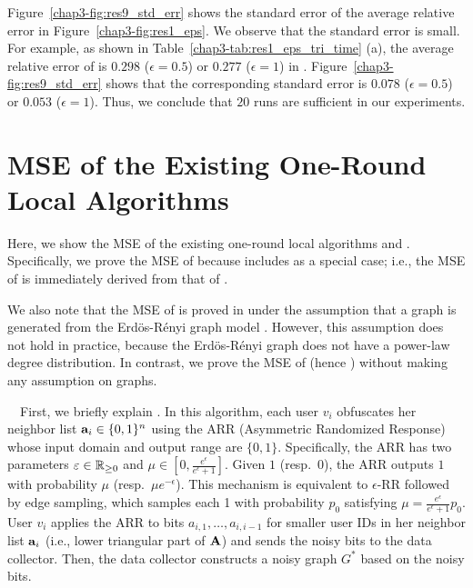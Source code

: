 Figure~\ref{chap3-fig:res9_std_err} shows the standard error of the average relative error in Figure~\ref{chap3-fig:res1_eps}. 
We observe that the standard error is small. 
For example, as shown in Table~\ref{chap3-tab:res1_eps_tri_time} (a), the average relative error of \AlgWSTriVR{} is $0.298$ ($\epsilon=0.5$) or $0.277$ ($\epsilon=1$) in \Gplus{}. 
Figure~\ref{chap3-fig:res9_std_err} shows that the corresponding standard error is $0.078$ ($\epsilon=0.5$) or $0.053$ ($\epsilon=1$). Thus, we conclude that $20$ runs are sufficient in our experiments. 

\section{MSE of the Existing One-Round Local Algorithms}
\label{chap3-sec:upper}

Here, we show the MSE of the existing one-round local algorithms \AlgARRTri{} \cite{Imola_USENIX22} and \AlgRRTri{} \cite{Imola_USENIX21}.
Specifically, we prove the MSE of \AlgARRTri{} because \AlgARRTri{} includes \AlgRRTri{} as a special case; i.e., the MSE of \AlgRRTri{} is immediately derived from that of \AlgARRTri{}.

We also note that the MSE of \AlgRRTri{} is proved in \cite{Imola_USENIX21} under the assumption that a graph is generated from the Erd\"os-R\'enyi graph model \cite{NetworkScience}.
However, this assumption does not hold in practice, because the Erd\"os-R\'enyi graph does not have a power-law degree distribution.
In contrast, we prove the MSE of \AlgARRTri{} (hence \AlgRRTri{}) without making any assumption on graphs.


\smallskip
{}~~First, we briefly explain \AlgARRTri{}.
In this algorithm, each user $v_i$ obfuscates her neighbor list $\mathbf{a}_i \in \{0,1\}^n$ using the ARR (Asymmetric Randomized Response) whose input domain and output range are $\{0,1\}$.
Specifically, the ARR has two parameters $\varepsilon \in \mathbb{R}_{\ge0}$ and $\mu \in [0,\frac{e^\epsilon}{e^\epsilon + 1}]$.
Given $1$ (resp.~$0$), the ARR outputs $1$ with probability $\mu$ (resp.~$\mu e^{-\epsilon}$).
This mechanism is equivalent to $\epsilon$-RR
followed by edge sampling, which samples each 1 with probability $p_0$ satisfying $\mu = \frac{e^\epsilon}{e^\epsilon+1} p_0$.
User $v_i$ applies the ARR to bits $a_{i,1}, \ldots, a_{i,i-1}$ for smaller user IDs in her neighbor list $\mathbf{a}_i$ (i.e., lower triangular part of $\mathbf{A}$) and sends the noisy bits to the data collector.
Then, the data collector constructs a noisy graph $G^*$ based on the noisy bits.

